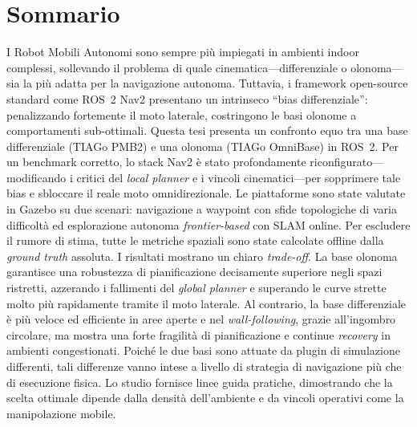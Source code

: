 \documentclass[12pt, a4paper, twoside, openright]{report}
\begin{document}
\cleardoublepage
\chapter*{Sommario}
I Robot Mobili Autonomi sono sempre più impiegati in ambienti indoor complessi, sollevando il problema di quale cinematica---differenziale o olonoma---sia la più adatta per la navigazione autonoma. Tuttavia, i framework open-source standard come ROS~2 Nav2 presentano un intrinseco ``bias differenziale'': penalizzando fortemente il moto laterale, costringono le basi olonome a comportamenti sub-ottimali. Questa tesi presenta un confronto equo tra una base differenziale (TIAGo PMB2) e una olonoma (TIAGo OmniBase) in ROS~2. Per un benchmark corretto, lo stack Nav2 è stato profondamente riconfigurato---modificando i critici del \textit{local planner} e i vincoli cinematici---per sopprimere tale bias e sbloccare il reale moto omnidirezionale. Le piattaforme sono state valutate in Gazebo su due scenari: navigazione a waypoint con sfide topologiche di varia difficoltà ed esplorazione autonoma \textit{frontier-based} con SLAM online. Per escludere il rumore di stima, tutte le metriche spaziali sono state calcolate offline dalla \textit{ground truth} assoluta. I risultati mostrano un chiaro \textit{trade-off}. La base olonoma garantisce una robustezza di pianificazione decisamente superiore negli spazi ristretti, azzerando i fallimenti del \textit{global planner} e superando le curve strette molto più rapidamente tramite il moto laterale. Al contrario, la base differenziale è più veloce ed efficiente in aree aperte e nel \textit{wall-following}, grazie all'ingombro circolare, ma mostra una forte fragilità di pianificazione e continue \textit{recovery} in ambienti congestionati. Poiché le due basi sono attuate da plugin di simulazione differenti, tali differenze vanno intese a livello di strategia di navigazione più che di esecuzione fisica. Lo studio fornisce linee guida pratiche, dimostrando che la scelta ottimale dipende dalla densità dell'ambiente e da vincoli operativi come la manipolazione mobile.



\tableofcontents
\cleardoublepage









\end{document}
